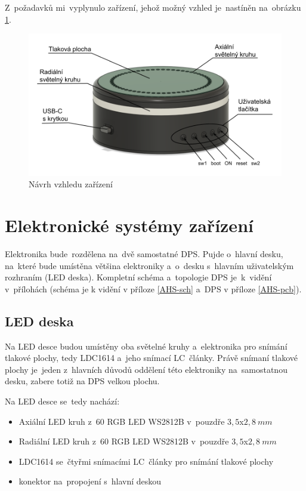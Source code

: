 Z~požadavků mi~vyplynulo zařízení, jehož možný vzhled je~nastíněn na~obrázku \ref{fig:AHS-nacrt}.
\begin{figure}[h]
    \centering
    \includegraphics[width=\textwidth]{text/PraktickaCast/img/AHS-nacrt.png}
    \caption{Návrh vzhledu zařízení}
    \label{fig:AHS-nacrt}
\end{figure}

\newpage
\section{Elektronické systémy zařízení}

Elektronika bude~rozdělena na~dvě samostatné DPS.
Pujde o~hlavní desku, na~které bude umístěna většina elektroniky a~o~desku s~hlavním uživatelským rozhraním (LED deska).
Kompletní schéma a~topologie DPS je~k~vidění v~přílohách (schéma je k vidění v příloze \ref{AHS-sch} a~DPS v příloze \ref{AHS-pcb}).


\subsection{LED deska}
Na LED desce budou umístěny oba světelné kruhy a~elektronika pro snímání tlakové plochy, tedy LDC1614 \cite{LDC1614} a~jeho snímací LC~články.
Právě snímaní tlakové plochy je~jeden z~hlavních důvodů oddělení této elektroniky na~samostatnou desku, zabere totiž na DPS velkou plochu.

Na LED desce se~tedy nachází:
\begin{itemize}
    \item Axiální LED kruh z~60 RGB LED WS2812B v~pouzdře \(3,5\)\;x\;\(2,8~mm\)
    \item Radiální LED kruh z~60 RGB LED WS2812B v~pouzdře \(3,5\)\;x\;\(2,8~mm\)
    \item LDC1614 se~čtyřmi snímacími LC~články pro snímání tlakové plochy 
    \item konektor na~propojení s~hlavní deskou
\end{itemize}

